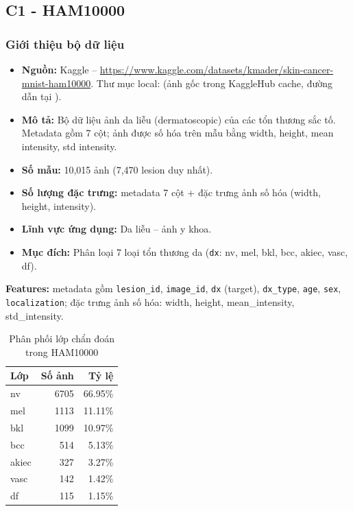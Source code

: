 \subsection{C1 - HAM10000}

\subsubsection{Giới thiệu bộ dữ liệu}

\begin{itemize}
 \item \textbf{Nguồn:} Kaggle -- \url{https://www.kaggle.com/datasets/kmader/skin-cancer-mnist-ham10000}. Thư mục local:  (ảnh gốc trong KaggleHub cache, đường dẫn tại ).
 \item \textbf{Mô tả:} Bộ dữ liệu ảnh da liễu (dermatoscopic) của các tổn thương sắc tố. Metadata gồm 7 cột; ảnh được số hóa trên mẫu bằng width, height, mean intensity, std intensity.
 \item \textbf{Số mẫu:} 10,015 ảnh (7,470 lesion duy nhất).
 \item \textbf{Số lượng đặc trưng:} metadata 7 cột + đặc trưng ảnh số hóa (width, height, intensity).
 \item \textbf{Lĩnh vực ứng dụng:} Da liễu -- ảnh y khoa.
 \item \textbf{Mục đích:} Phân loại 7 loại tổn thương da (\texttt{dx}: nv, mel, bkl, bcc, akiec, vasc, df).
\end{itemize}

\textbf{Features:} metadata gồm \texttt{lesion\_id}, \texttt{image\_id}, \texttt{dx} (target), \texttt{dx\_type}, \texttt{age}, \texttt{sex}, \texttt{localization}; đặc trưng ảnh số hóa: width, height, mean\_intensity, std\_intensity.

\begin{table}[H]
\centering
\caption{Phân phối lớp chẩn đoán trong HAM10000}
\label{tab:ham_class_distribution}
\small
\begin{tabular}{lrr}
\toprule
Lớp & Số ảnh & Tỷ lệ \\
\midrule
nv & 6705 & 66.95\% \\
mel & 1113 & 11.11\% \\
bkl & 1099 & 10.97\% \\
bcc & 514 & 5.13\% \\
akiec & 327 & 3.27\% \\
vasc & 142 & 1.42\% \\
df & 115 & 1.15\% \\
\bottomrule
\end{tabular}
\end{table}

